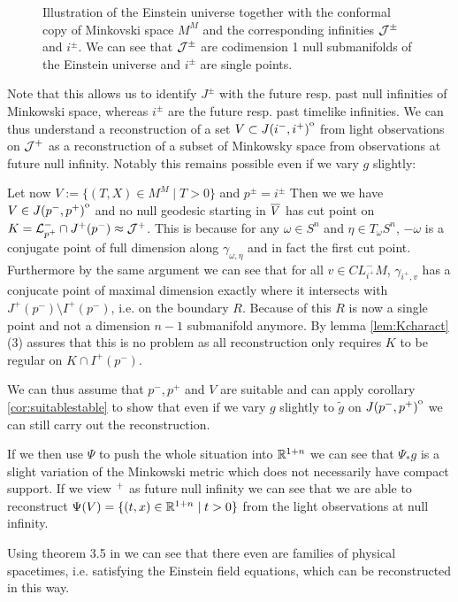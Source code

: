 \begin{figure}\label{fig:EU}
    \centering
    
    \caption{
        Illustration of the Einstein universe together with the conformal copy of Minkovski space $M^M$ and the corresponding infinities ${\mathcal{J}}^\pm$ and $i^\pm$. We can see that ${\mathcal{J^\pm}}$ are codimension 1 null submanifolds of the Einstein universe and $i^\pm$ are single points.
    }
\end{figure}
Note that this allows us to identify $J^\pm$ with the future resp. past null infinities of Minkowski space, whereas $i^\pm$ are the future resp. past timelike infinities.
We can thus understand a reconstruction of a set $V\subset {\kern0ptJ(i^-,i^+)}^{\mathrm{o}}$ from light observations on ${\mathcal{J}}^+$ as a reconstruction of a subset of Minkowsky space from observations at future null infinity. Notably this remains possible even if we vary $g$ slightly:
\begin{example}Let now $V:= \{(T,X)\in M^M \mid T>0\}$ and $p^\pm = i^\pm$ Then we we have $V\in {\kern0ptJ(p^-,p^+)}^{\mathrm{o}}$ and no null geodesic starting in ${\overline{V}}$ has cut point on $K={\mathcal{L}}^-_{p^+}\cap J^+(p^-) \approx {\mathcal{J}}^+$. This is because for any $\omega \in S^n$ and $\eta\in T_\omega S^n$, $-\omega$ is a conjugate point of full dimension along $\gamma_{\omega,\eta}$ and in fact the first cut point. Furthermore by the same argument we can see that for all $v\in CL^-_{i^+}M$, $\gamma_{i^+,v}$ has a conjucate point of maximal dimension exactly where it intersects with $J^+(p^-)\setminus I^+(p^-)$, i.e. on the boundary $R$. Because of this $R$ is now a single point and not a dimension $n-1$ submanifold anymore. By lemma \ref{lem:Kcharact}(3) assures that this is no problem as all reconstruction only requires $K$ to be regular on $K\cap I^+(p^-)$.

We can thus assume that $p^-,p^+$ and $V$ are suitable and can apply corollary \ref{cor:suitablestable} to show that even if we vary $g$ slightly to $\widetilde{g}$ on ${\kern0ptJ(p^-,p^+)}^{\mathrm{o}}$ we can still carry out the reconstruction. 

If we then use $\Psi$ to push the whole situation into $\mathbb{R}^{1+n}$ we can see that $\Psi_*g$ is a slight variation of the Minkowski metric which does not necessarily have compact support. If we view ${\mathcal{}}^+$ as future null infinity we can see that we are able to reconstruct $\Psi(V) = \{(t,x)\in \mathbb{R}^{1+n} \mid t>0\}$ from the light observations at null infinity.

Using theorem 3.5 in \cite{friedrichspacetime} we can see that there even are families of physical spacetimes, i.e. satisfying the Einstein field equations, which can be reconstructed in this way.
\end{example}
